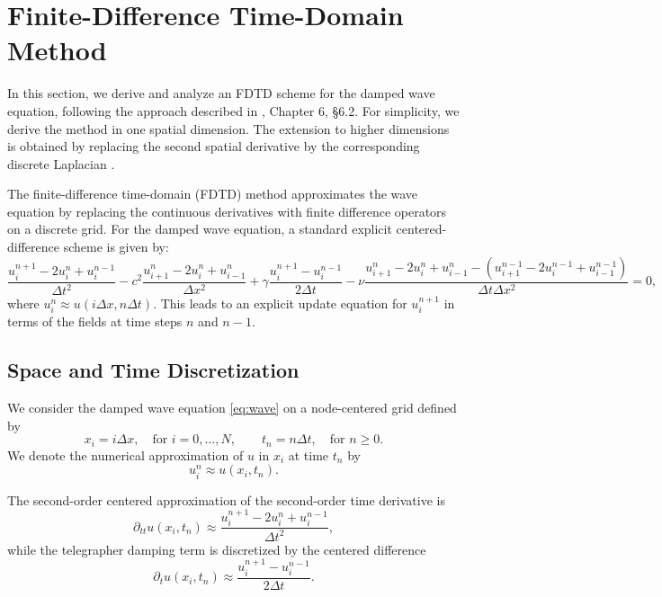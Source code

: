 \documentclass{Configuration_Files/PoliMi3i_thesis}
\begin{document}
\section{Finite-Difference Time-Domain Method}
In this section, we derive and analyze an FDTD scheme for the damped wave equation, following the approach described in \cite{bilbao_numerical_2009}, Chapter 6, \S6.2. For simplicity, we derive the method in one spatial dimension. The extension to higher dimensions is obtained by replacing the second spatial derivative by the corresponding discrete Laplacian \cite[Chapter 11]{bilbao_numerical_2009}.

The finite-difference time-domain (FDTD) method approximates the wave equation by replacing the continuous derivatives with finite difference operators on a discrete grid. For the damped wave equation, a standard explicit centered-difference scheme is given by:
\begin{equation}
\label{eq:fdtd_scheme}
\frac{u_i^{n+1} - 2u_i^n + u_i^{n-1}}{\Delta t^2}
- c^2 \frac{u_{i+1}^n - 2u_i^n + u_{i-1}^n}{\Delta x^2}
+ \gamma \frac{u_i^{n+1} - u_i^{n-1}}{2\Delta t}
- \nu \frac{u_{i+1}^n - 2u_i^n + u_{i-1}^n - (u_{i+1}^{n-1} - 2u_i^{n-1} + u_{i-1}^{n-1})}{\Delta t \Delta x^2} = 0,
\end{equation}
where $u_i^n \approx u(i\Delta x, n\Delta t)$. This leads to an explicit update equation for $u_i^{n+1}$ in terms of the fields at time steps $n$ and $n-1$.


\subsection{Space and Time Discretization}
We consider the damped wave equation \eqref{eq:wave} on a node-centered grid defined by
\[
x_i=i\Delta x, \quad \text{for } i = 0, \dots, N, \qquad t_n=n\Delta t, \quad \text{for } n \ge 0.
\]
We denote the numerical approximation of $u$ in $x_i$ at time $t_n$ by
\[
u_i^n\approx u(x_i,t_n).
\]

The second-order centered approximation of the second-order time derivative is
\begin{equation*}
\partial_{tt}u(x_i,t_n)
\approx
\frac{u_i^{n+1}-2u_i^n+u_i^{n-1}}{\Delta t^2},
\end{equation*}
while the telegrapher damping term is discretized by the centered difference
\begin{equation*}
\partial_tu(x_i,t_n)
\approx
\frac{u_i^{n+1}-u_i^{n-1}}{2\Delta t}.
\end{equation*}
\end{document}
